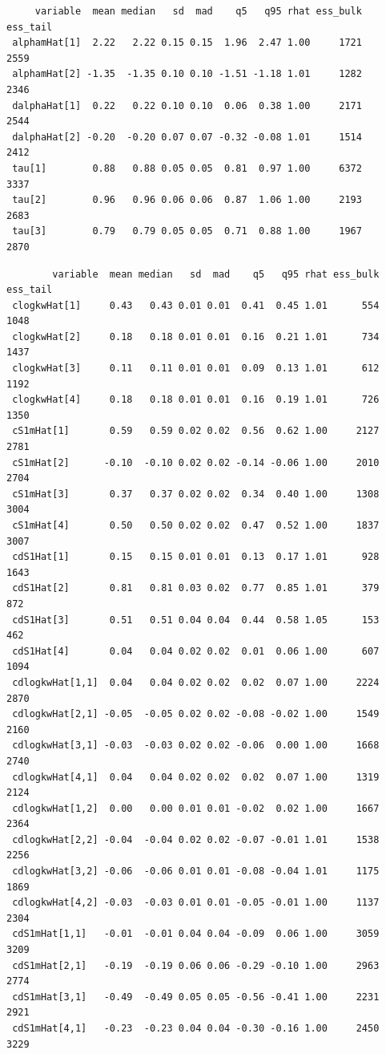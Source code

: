 \documentclass[
]{article}
\begin{document}
\begin{verbatim}
     variable  mean median   sd  mad    q5   q95 rhat ess_bulk ess_tail
 alphamHat[1]  2.22   2.22 0.15 0.15  1.96  2.47 1.00     1721     2559
 alphamHat[2] -1.35  -1.35 0.10 0.10 -1.51 -1.18 1.01     1282     2346
 dalphaHat[1]  0.22   0.22 0.10 0.10  0.06  0.38 1.00     2171     2544
 dalphaHat[2] -0.20  -0.20 0.07 0.07 -0.32 -0.08 1.01     1514     2412
 tau[1]        0.88   0.88 0.05 0.05  0.81  0.97 1.00     6372     3337
 tau[2]        0.96   0.96 0.06 0.06  0.87  1.06 1.00     2193     2683
 tau[3]        0.79   0.79 0.05 0.05  0.71  0.88 1.00     1967     2870
\end{verbatim}

\begin{verbatim}
        variable  mean median   sd  mad    q5   q95 rhat ess_bulk ess_tail
 clogkwHat[1]     0.43   0.43 0.01 0.01  0.41  0.45 1.01      554     1048
 clogkwHat[2]     0.18   0.18 0.01 0.01  0.16  0.21 1.01      734     1437
 clogkwHat[3]     0.11   0.11 0.01 0.01  0.09  0.13 1.01      612     1192
 clogkwHat[4]     0.18   0.18 0.01 0.01  0.16  0.19 1.01      726     1350
 cS1mHat[1]       0.59   0.59 0.02 0.02  0.56  0.62 1.00     2127     2781
 cS1mHat[2]      -0.10  -0.10 0.02 0.02 -0.14 -0.06 1.00     2010     2704
 cS1mHat[3]       0.37   0.37 0.02 0.02  0.34  0.40 1.00     1308     3004
 cS1mHat[4]       0.50   0.50 0.02 0.02  0.47  0.52 1.00     1837     3007
 cdS1Hat[1]       0.15   0.15 0.01 0.01  0.13  0.17 1.01      928     1643
 cdS1Hat[2]       0.81   0.81 0.03 0.02  0.77  0.85 1.01      379      872
 cdS1Hat[3]       0.51   0.51 0.04 0.04  0.44  0.58 1.05      153      462
 cdS1Hat[4]       0.04   0.04 0.02 0.02  0.01  0.06 1.00      607     1094
 cdlogkwHat[1,1]  0.04   0.04 0.02 0.02  0.02  0.07 1.00     2224     2870
 cdlogkwHat[2,1] -0.05  -0.05 0.02 0.02 -0.08 -0.02 1.00     1549     2160
 cdlogkwHat[3,1] -0.03  -0.03 0.02 0.02 -0.06  0.00 1.00     1668     2740
 cdlogkwHat[4,1]  0.04   0.04 0.02 0.02  0.02  0.07 1.00     1319     2124
 cdlogkwHat[1,2]  0.00   0.00 0.01 0.01 -0.02  0.02 1.00     1667     2364
 cdlogkwHat[2,2] -0.04  -0.04 0.02 0.02 -0.07 -0.01 1.01     1538     2256
 cdlogkwHat[3,2] -0.06  -0.06 0.01 0.01 -0.08 -0.04 1.01     1175     1869
 cdlogkwHat[4,2] -0.03  -0.03 0.01 0.01 -0.05 -0.01 1.00     1137     2304
 cdS1mHat[1,1]   -0.01  -0.01 0.04 0.04 -0.09  0.06 1.00     3059     3209
 cdS1mHat[2,1]   -0.19  -0.19 0.06 0.06 -0.29 -0.10 1.00     2963     2774
 cdS1mHat[3,1]   -0.49  -0.49 0.05 0.05 -0.56 -0.41 1.00     2231     2921
 cdS1mHat[4,1]   -0.23  -0.23 0.04 0.04 -0.30 -0.16 1.00     2450     3229

\end{verbatim}
\end{document}
